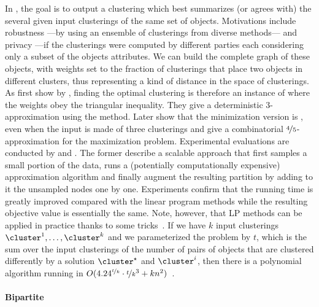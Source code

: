In \msc{}, the goal is to output a clustering which best summarizes (or agrees with) the several
given input clusterings of the same set of objects.  Motivations include robustness ---by using an
ensemble of clusterings from diverse methods--- and privacy ---if the clusterings were computed by
different parties each considering only a subset of the objects attributes. We can build the
complete graph of these objects, with weights set to the fraction of clusterings that place two
objects in different clusters, thus representing a kind of distance in the space of clusterings.  As
first show by \textcite{Gionis2007}, finding the optimal clustering is therefore an instance of
\pcc{} where the weights obey the triangular inequality. They give a deterministic $3$-approximation
using the \regionGrow{} method. Later \textcite{Bonizzoni2008} show that
the minimization version is \APXh{}, even when the input is made of three clusterings and give a
combinatorial $\nicefrac{4}{5}$-approximation for the maximization problem. Experimental evaluations are
conducted by \textcite{Bertolacci07} and \textcite{Filkov08}. The former describe a scalable
approach that first samples a small portion of the data, runs a (potentially computationally
expensive) approximation algorithm and finally augment the resulting partition by adding to it the
unsampled nodes one by one.  Experiments confirm that the running time is greatly improved compared
with the linear program methods while the resulting objective value is essentially the same. Note,
however, that LP methods can be applied in practice thanks to some tricks~\autocite{ConsensusLP10}.
If we have $k$ input clusterings $\cluster^1,\ldots,\cluster^k$ and we parameterized the problem by
$t$, which is the sum over the input clusterings of the number of pairs of objects that are clustered
differently by a solution $\cluster^\star$ and $\cluster^i$, then there is a polynomial algorithm
running in $O(4.24^{\nicefrac{t}{k}}\cdot \nicefrac{t}{k}^3 +
kn^2)$~\autocite{parameterizedConsensus14}.

\paragraph{Bipartite \pcc{}}

